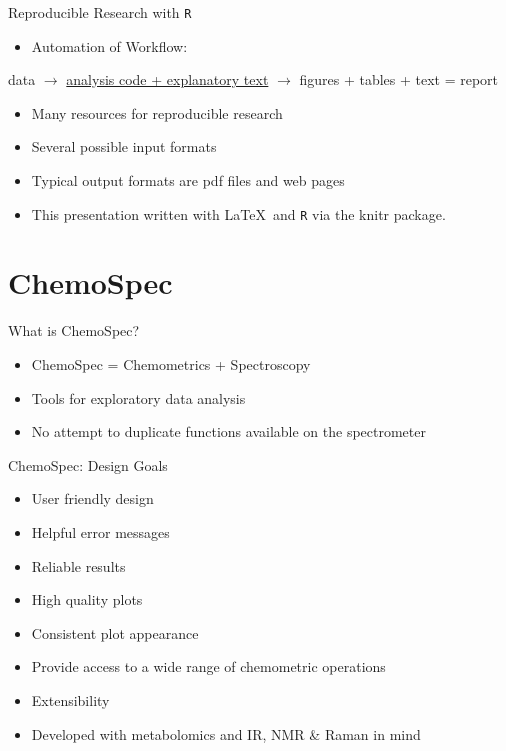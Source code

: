 \documentclass[aspectratio=169]{beamer}\usepackage[]{graphicx}\usepackage[]{color}
\begin{document}

\begin{frame}{Reproducible Research with \texttt{R}}

  \begin{itemize}
    \item Automation of Workflow:
  \end{itemize}

\begin{center}
data $\rightarrow$ \underline{analysis code + explanatory text} $\rightarrow$ figures + tables + text = report
\end{center}

  \begin{itemize}
    \item Many resources for reproducible research
    \item Several possible input formats
    \item Typical output formats are pdf files and web pages
    \item This presentation written with \LaTeX \ and \texttt{R} via the knitr package.
  \end{itemize}
\end{frame}

\section*{ChemoSpec}

\begin{frame}{What is ChemoSpec?}
  \begin{itemize}
  \item ChemoSpec = Chemometrics + Spectroscopy
  \item Tools for exploratory data analysis
  \item No attempt to duplicate functions available on the spectrometer
  \end{itemize}
\end{frame}


\begin{frame}{ChemoSpec: Design Goals}
  \begin{itemize}
  \item User friendly design
  \item Helpful error messages
  \item Reliable results
  \item High quality plots
  \item Consistent plot appearance
  \item Provide access to a wide range of chemometric operations
  \item Extensibility
  \item Developed with metabolomics and IR, NMR \& Raman in mind
  \end{itemize}
\end{frame}
\end{document}
